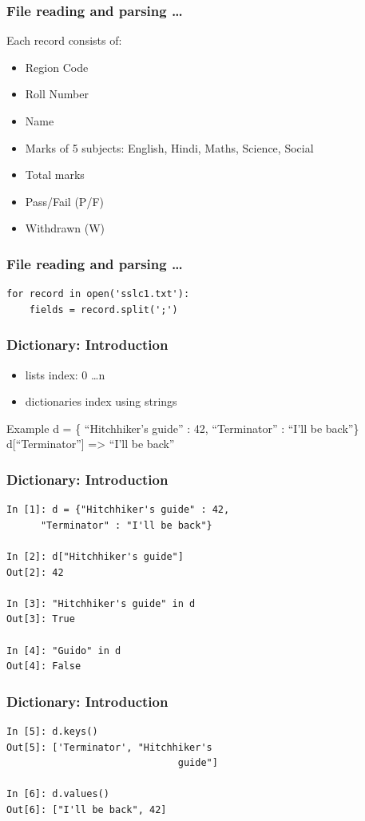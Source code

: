 \documentclass[14pt,compress]{beamer}
\begin{document}
\begin{frame}
  \frametitle{File reading and parsing \ldots}
  Each record consists of:
  \begin{itemize}
    \item Region Code
    \item Roll Number
    \item Name
    \item Marks of 5 subjects: English, Hindi, Maths, Science, Social
    \item Total marks
    \item Pass/Fail (P/F)
    \item Withdrawn (W)
  \end{itemize}
\end{frame}

\begin{frame}[fragile]
  \frametitle{File reading and parsing \ldots}
  \begin{lstlisting}
for record in open('sslc1.txt'):
    fields = record.split(';')
  \end{lstlisting}
\end{frame}

\begin{frame}[fragile]
  \frametitle{Dictionary: Introduction}
  \begin{itemize}
    \item lists index: 0 \ldots n
    \item dictionaries index using strings
  \end{itemize}
\begin{block}{Example}
d = \{ ``Hitchhiker's guide'' : 42,
     ``Terminator'' : ``I'll be back''\}\\
d[``Terminator''] => ``I'll be back''
\end{block}
\end{frame}

\begin{frame}[fragile]
  \frametitle{Dictionary: Introduction}
\begin{lstlisting}
In [1]: d = {"Hitchhiker's guide" : 42,
      "Terminator" : "I'll be back"}

In [2]: d["Hitchhiker's guide"]
Out[2]: 42

In [3]: "Hitchhiker's guide" in d
Out[3]: True

In [4]: "Guido" in d
Out[4]: False
\end{lstlisting}
\end{frame}

\begin{frame}[fragile]
  \frametitle{Dictionary: Introduction}
\begin{lstlisting}
In [5]: d.keys()
Out[5]: ['Terminator', "Hitchhiker's 
                              guide"]

In [6]: d.values()
Out[6]: ["I'll be back", 42]
\end{lstlisting}
\end{frame}
\end{document}
